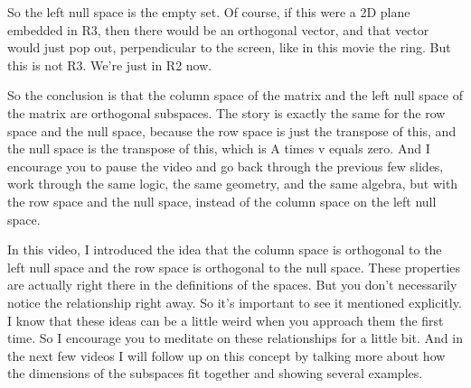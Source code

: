 \documentclass[fleqn,10pt]{olplainarticle}
\theoremstyle{definition}
\theoremstyle{remark}
\begin{document}
So the left null space is the empty set. Of course, if this were a 2D plane embedded in R3, then there would be an orthogonal vector, and that vector would just pop out, perpendicular to the screen, like in this movie the ring. But this is not R3. We're just in R2 now.

So the conclusion is that the column space of the matrix and the left null space of the matrix are orthogonal subspaces. The story is exactly the same for the row space and the null space, because the row space is just the transpose of this, and the null space is the transpose of this, which is A times v equals zero. And I encourage you to pause the video and go back through the previous few slides, work through the same logic, the same geometry, and the same algebra, but with the row space and the null space, instead of the column space on the left null space.

In this video, I introduced the idea that the column space is orthogonal to the left null space and the row space is orthogonal to the null space. These properties are actually right there in the definitions of the spaces. But you don't necessarily notice the relationship right away. So it's important to see it mentioned explicitly. I know that these ideas can be a little weird when you approach them the first time. So I encourage you to meditate on these relationships for a little bit. And in the next few videos I will follow up on this concept by talking more about how the dimensions of the subspaces fit together and showing several examples.
\end{document}
